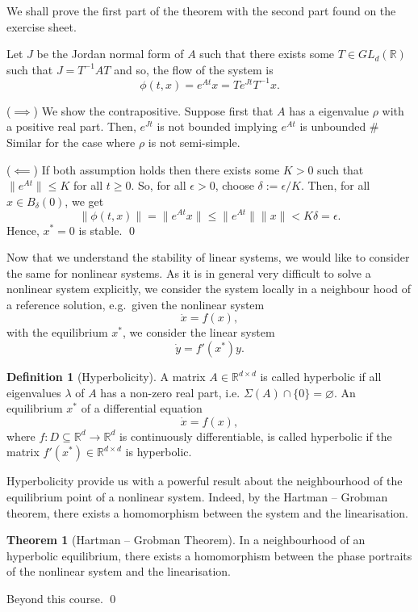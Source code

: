 \documentclass[
]{article}
\theoremstyle{definition}
\newtheorem{theorem}{Theorem}
\theoremstyle{definition}
\newtheorem{definition}{Definition}[section]
\begin{document}
\proof

We shall prove the first part of the theorem with the second part found
on the exercise sheet.

Let \(J\) be the Jordan normal form of \(A\) such that there exists some
\(T \in GL_d(\mathbb{R})\) such that \(J = T^{-1}A T\) and so, the flow
of the system is \[\phi(t, x) = e^{At}x = T e^{Jt} T^{-1}x.\]

(\(\implies\)) We show the contrapositive. Suppose first that \(A\) has
a eigenvalue \(\rho\) with a positive real part. Then, \(e^{Jt}\) is not
bounded implying \(e^{At}\) is unbounded \# Similar for the case where
\(\rho\) is not semi-simple.

(\(\impliedby\)) If both assumption holds then there exists some
\(K > 0\) such that \(\|e^{At}\| \le K\) for all \(t \ge 0\). So, for
all \(\epsilon > 0\), choose \(\delta := \epsilon / K\). Then, for all
\(x \in B_\delta(0)\), we get
\[\|\phi(t, x)\| = \|e^{At}x\| \le \|e^{At}\| \|x\| < K \delta = \epsilon.\]
Hence, \(x^* = 0\) is stable. \qed

Now that we understand the stability of linear systems, we would like to
consider the same for nonlinear systems. As it is in general very
difficult to solve a nonlinear system explicitly, we consider the system
locally in a neighbour hood of a reference solution, e.g.~given the
nonlinear system \[\dot x = f(x),\] with the equilibrium \(x^*\), we
consider the linear system \[\dot y = f'(x^*) y.\]

\begin{definition}[Hyperbolicity]
  A matrix \(A \in \mathbb{R}^{d \times d}\) is called hyperbolic if all eigenvalues 
  \(\lambda\) of \(A\) has a non-zero real part, i.e. \(\Sigma(A) \cap \{0\} = \varnothing\). 
  An equilibrium \(x^*\) of a differential equation 
  \[\dot x = f(x),\]
  where \(f : D \subseteq \mathbb{R}^d \to \mathbb{R}^d\) is continuously differentiable, 
  is called hyperbolic if the matrix \(f'(x^*) \in \mathbb{R}^{d \times d}\) is 
  hyperbolic.
\end{definition}

Hyperbolicity provide us with a powerful result about the neighbourhood
of the equilibrium point of a nonlinear system. Indeed, by the Hartman
-- Grobman theorem, there exists a homomorphism between the system and
the linearisation.

\begin{theorem}[Hartman -- Grobman Theorem]
  In a neighbourhood of an hyperbolic equilibrium, there exists a homomorphism 
  between the phase portraits of the nonlinear system and the linearisation.
\end{theorem}
\proof

Beyond this course. \qed
\end{document}
